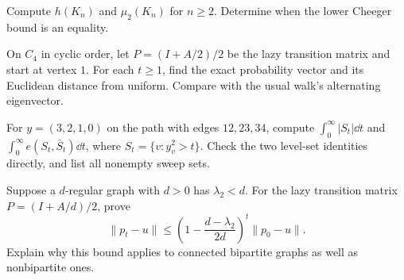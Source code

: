 \begin{exercise}[$\star$]\label{ex:v8c06a}
Compute $h(K_n)$ and $\mu_2(K_n)$ for $n\ge2$. Determine when the lower Cheeger bound is an equality.
\end{exercise}
\begin{exercise}[$\star\star$]\label{ex:v8c06b}
On $C_4$ in cyclic order, let $P=(I+A/2)/2$ be the lazy transition matrix and start at vertex $1$. For each $t\ge1$, find the exact probability vector and its Euclidean distance from uniform. Compare with the usual walk's alternating eigenvector.
\end{exercise}
\begin{exercise}[$\star$]\label{ex:v8c06c}
For $y=(3,2,1,0)$ on the path with edges $12,23,34$, compute $\int_0^\infty|S_t|\dd t$ and $\int_0^\infty e(S_t,\bar S_t)\dd t$, where $S_t=\{v:y_v^2>t\}$. Check the two level-set identities directly, and list all nonempty sweep sets.
\end{exercise}
\begin{exercise}[$\star\star$]\label{ex:v8c06d}
Suppose a $d$-regular graph with $d>0$ has $\lambda_2<d$. For the lazy transition matrix $P=(I+A/d)/2$, prove
\[
\|p_t-u\|\le\left(1-\frac{d-\lambda_2}{2d}\right)^t\|p_0-u\|.
\]
Explain why this bound applies to connected bipartite graphs as well as nonbipartite ones.
\end{exercise}

